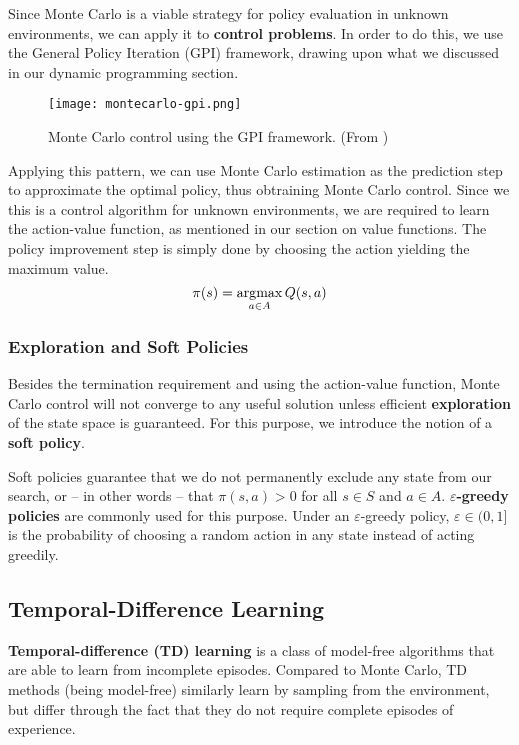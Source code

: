 Since Monte Carlo is a viable strategy for policy evaluation in unknown environments, we can apply it to \textbf{control problems}.
In order to do this, we use the General Policy Iteration (GPI) framework, drawing upon what we discussed in our dynamic programming section.

\begin{figure}[h]
    \texttt{[image: montecarlo-gpi.png]}
    \centering
    \caption{Monte Carlo control using the GPI framework. (From \cite{rlai})}
\end{figure}

Applying this pattern, we can use Monte Carlo estimation as the prediction step to approximate the optimal policy, thus obtraining Monte Carlo control.
Since we this is a control algorithm for unknown environments, we are required to learn the action-value function, as mentioned in our section on value functions.
The policy improvement step is simply done by choosing the action yielding the maximum value.
\begin{equation}
    \pi(s) = \operatorname*{\arg\!\max}_{a \in A}{Q(s, a)}
\end{equation}

\subsubsection{Exploration and Soft Policies}

Besides the termination requirement and using the action-value function, Monte Carlo control will not converge to any useful solution unless efficient \textbf{exploration} of the state space is guaranteed.
For this purpose, we introduce the notion of a \textbf{soft policy}.

Soft policies guarantee that we do not permanently exclude any state from our search, or -- in other words -- that $\pi (s, a) > 0$ for all $s \in S$ and $a \in A$.
\textbf{$\varepsilon$-greedy policies} are commonly used for this purpose.
Under an $\varepsilon$-greedy policy, $\varepsilon \in (0, 1]$ is the probability of choosing a random action in any state instead of acting greedily.

\subsection{Temporal-Difference Learning} \label{rl:td}
\textbf{Temporal-difference (TD) learning} is a class of model-free algorithms that are able to learn from incomplete episodes.
Compared to Monte Carlo, TD methods (being model-free) similarly learn by sampling from the environment, but differ through the fact that they do not require complete episodes of experience.

